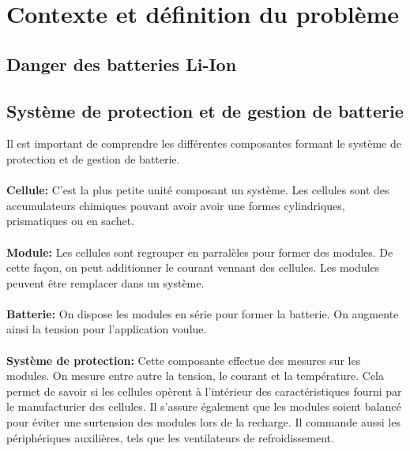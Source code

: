 \section{Contexte et définition du problème}


\subsection{Danger des batteries Li-Ion}

\subsection{Système de protection et de gestion de batterie}


Il est important de comprendre les différentes composantes formant le système de protection et de gestion de batterie.

\paragraph{}
\textbf{Cellule:} C'est la plus petite unité composant un système. Les cellules sont des accumulateurs chimiques pouvant avoir avoir une formes cylindriques, prismatiques ou en sachet.  

\paragraph{}
\textbf{Module:} Les cellules sont regrouper en parralèles pour former des modules. De cette façon, on peut additionner le courant vennant des cellules. Les modules peuvent être remplacer dans un système.

\paragraph{}
\textbf{Batterie:} On dispose les modules en série pour former la batterie. On augmente ainsi la tension pour l'application voulue.

\paragraph{}
\textbf{Système de protection:} Cette composante effectue des mesures sur les modules. On mesure entre autre la tension, le courant et la température. Cela permet de savoir si les cellules opèrent à l'intérieur des caractéristiques fourni par le manufacturier des cellules. Il s'assure également que les modules soient balancé pour éviter une surtension des modules lors de la recharge. Il commande aussi les périphériques auxilières, tels que les ventilateurs de refroidissement.



